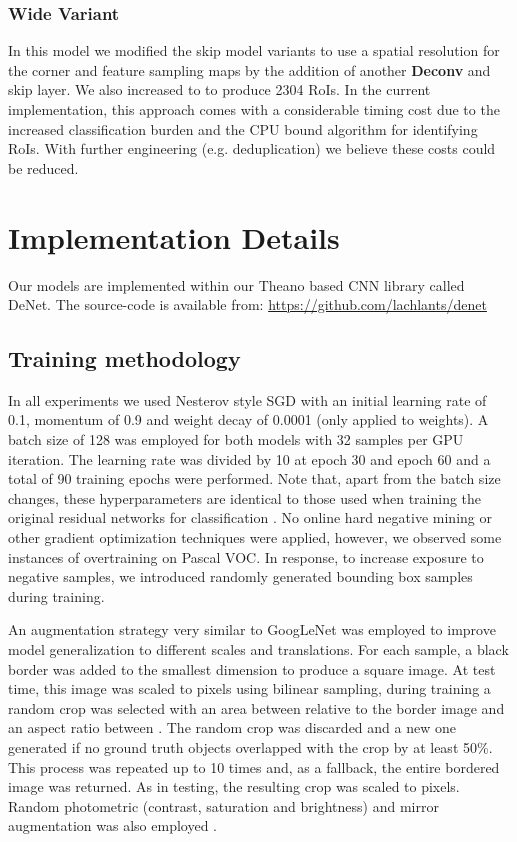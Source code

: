 \documentclass[10pt,twocolumn]{article}
\begin{document}
\subsubsection{Wide Variant}

In this model we modified the skip model variants to use a  spatial resolution for the corner and feature sampling maps by the addition of another \textbf{Deconv} and skip layer. We also increased  to  to produce 2304 RoIs. In the current implementation, this approach comes with a considerable timing cost due to the increased classification burden and the CPU bound algorithm for identifying RoIs. With further engineering (e.g. deduplication) we believe these costs could be reduced.

\section{Implementation Details} \label{sec:implement} 

Our models are implemented within our Theano based CNN library called DeNet. The source-code is available from: \href{url}{https://github.com/lachlants/denet}

\subsection{Training methodology} \label{sec:training}

In all experiments we used Nesterov style SGD\cite{nesterov-sgd} with an initial learning rate of 0.1, 
momentum of 0.9 and weight decay of 0.0001 (only applied to weights). A batch size of 128 was employed for both models with 32 samples per GPU iteration. The learning rate was divided by 10 at epoch 30 and epoch 60 and a total of 90 training epochs were performed. Note that, apart from the batch size changes, these hyperparameters are identical to those used when training the original residual networks for classification \cite{resnet}. No online hard negative mining \cite{ohem} or other gradient optimization techniques were applied, however, we observed some instances of overtraining on Pascal VOC. In response, to increase exposure to negative samples, we introduced  randomly generated bounding box samples during training.

An augmentation strategy very similar to GoogLeNet\cite{googlenet} was employed  to improve model generalization to different scales and translations. For each sample, a black border was added to the smallest dimension to produce a square image. At test time, this image was scaled to  pixels using bilinear sampling, during training a random crop was selected with an area between  relative to the border image and an aspect ratio between . The random crop was discarded and a new one generated if no ground truth objects overlapped with the crop by at least 50\%. This process was repeated up to 10 times and, as a fallback, the entire bordered image was returned. As in testing, the resulting crop was scaled to  pixels. Random photometric (contrast, saturation and brightness) and mirror augmentation was also employed \cite{googlenet}. 
\end{document}
